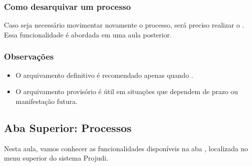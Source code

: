 \documentclass[letterpaper,10pt,brazil]{sphinxmanual}
\begin{document}
\subsubsection{Como desarquivar um processo}
\label{\detokenize{projud_41_arquivamento:como-desarquivar-um-processo}}
\sphinxAtStartPar
Caso seja necessário movimentar novamente o processo, será preciso realizar o . Essa funcionalidade é abordada em uma aula posterior.


\subsubsection{Observações}
\label{\detokenize{projud_41_arquivamento:observacoes}}\begin{itemize}
\item {} 
\sphinxAtStartPar
O arquivamento definitivo é recomendado apenas quando .

\item {} 
\sphinxAtStartPar
O arquivamento provisório é útil em situações que dependem de prazo ou manifestação futura.

\end{itemize}

\sphinxstepscope


\subsection{Aba Superior: Processos}
\label{\detokenize{projud_42_abasuperiorprocesso:aba-superior-processos}}\label{\detokenize{projud_42_abasuperiorprocesso::doc}}
\sphinxAtStartPar
Nesta aula, vamos conhecer as funcionalidades disponíveis na aba , localizada no menu superior do sistema Projudi.
\end{document}
